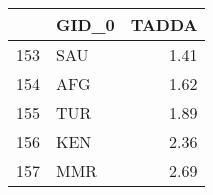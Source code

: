\begin{tabular}{llr}
\toprule
{} & GID\_0 &  TADDA \\
\midrule
153 &   SAU &   1.41 \\
154 &   AFG &   1.62 \\
155 &   TUR &   1.89 \\
156 &   KEN &   2.36 \\
157 &   MMR &   2.69 \\
\bottomrule
\end{tabular}
